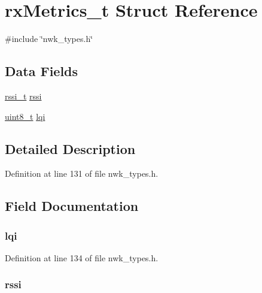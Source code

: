 \hypertarget{structrxMetrics__t}{\section{rx\-Metrics\-\_\-t \-Struct \-Reference}
\label{structrxMetrics__t}
}


{\ttfamily \#include \char`\"{}nwk\-\_\-types.\-h\char`\"{}}

\subsection*{\-Data \-Fields}
\begin{DoxyCompactItemize}
\item 
\hyperlink{nwk__types_8h_a35d5bc216e33176cc91f2bbff3bb66cc}{rssi\-\_\-t} \hyperlink{structrxMetrics__t_a587690cf0776e3ab29f446ea6dc988d4}{rssi}
\item 
\hyperlink{bsp__msp430__defs_8h_aba7bc1797add20fe3efdf37ced1182c5}{uint8\-\_\-t} \hyperlink{structrxMetrics__t_a0dd69605aea6dba42ffd851067dbfe77}{lqi}
\end{DoxyCompactItemize}


\subsection{\-Detailed \-Description}


\-Definition at line 131 of file nwk\-\_\-types.\-h.



\subsection{\-Field \-Documentation}
\hypertarget{structrxMetrics__t_a0dd69605aea6dba42ffd851067dbfe77}{
\subsubsection[{lqi}]{ {\bf lqi}}}\label{structrxMetrics__t_a0dd69605aea6dba42ffd851067dbfe77}


\-Definition at line 134 of file nwk\-\_\-types.\-h.

\hypertarget{structrxMetrics__t_a587690cf0776e3ab29f446ea6dc988d4}{
\subsubsection[{rssi}]{ {\bf rssi}}}\label{structrxMetrics__t_a587690cf0776e3ab29f446ea6dc988d4}


